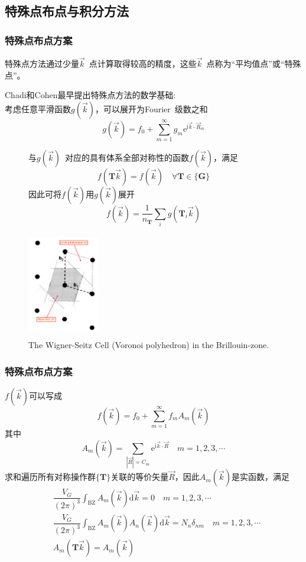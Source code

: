 \subsection{特殊点布点与积分方法}
\frame
{
	\frametitle{特殊点布点方案}
	特殊点方法通过少量$\vec k$~点计算取得较高的精度，这些$\vec k$~点称为“平均值点”或“特殊点”。
	
	\textrm{Chadi}和\textrm{Cohen}最早提出特殊点方法的数学基础:\\
	考虑任意平滑函数$g(\vec k)$，可以展开为\textrm{Fourier}~级数之和
	$$g(\vec k)=f_0+\sum_{m=1}^{\infty}g_m\mathrm{e}^{\mathrm{i}\vec k\cdot\vec R_m}$$
\begin{figure}[h!]
\begin{minipage}[t]{0.55\linewidth}
	与$g(\vec k)$~对应的具有体系全部对称性的函数$f(\vec k)$，满足
	$$f(\mathbf{T}\vec k)=f(\vec k)\quad\forall\mathbf{T}\in\{\mathbf{G}\}$$
	因此可将$f(\vec k)$用$g(\vec k)$展开
	$$f(\vec k)=\dfrac1{n_{\mathbf{T}}}\sum\limits_ig(\mathbf{T}_i\vec k)$$
\end{minipage}
\hfill
\begin{minipage}[t]{0.42\linewidth}
\centering
\vspace*{-0.5in}
\includegraphics[height=1.8in,width=1.25in,viewport=20 20 530 800,clip]{Figures/Reciprocal-WS.png}
\caption{\tiny \textrm{The Wigner-Seitz Cell (Voronoi polyhedron) in the Brillouin-zone.}}%
\label{Reciprocal-WS}
\end{minipage}
\end{figure} 
}

\frame
{
	\frametitle{特殊点布点方案}
	$f(\vec k)$可以写成
	$$f(\vec k)=f_0+\sum_{m=1}^{\infty}f_mA_m(\vec k)$$其中
	$$A_m(\vec k)=\sum_{|\vec R|=C_m}\mathrm{e}^{\mathrm{i}\vec k\cdot\vec R}\quad m=1,2,3,\cdots$$
	求和遍历所有对称操作群$\{\mathbf{T}\}$关联的等价矢量$\vec R$，因此$A_m(\vec k)$是实函数，满足
	\begin{displaymath}
		\begin{aligned}
			&\dfrac{V_G}{(2\pi)^3}\int_{\mathrm{BZ}}A_m(\vec k)\mathrm{d}\vec k=0\quad m=1,2,3,\cdots\\
			&\dfrac{V_G}{(2\pi)^3}\int_{\mathrm{BZ}}A_m(\vec k)A_n(\vec k)\mathrm{d}\vec k=N_n\delta_{nm}\quad m=1,2,3,\cdots\\
			&A_m(\mathbf{T}\vec k)=A_m(\vec k)
		\end{aligned}
	\end{displaymath}
}

